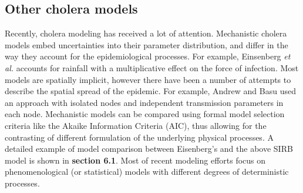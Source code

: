 \subsection{Other cholera models}

Recently, cholera modeling has received a lot of attention. Mechanistic cholera models embed uncertainties into their parameter distribution, and differ in the way they account for the epidemiological processes\cite{Kirpich:ControllingCholeraOuest:2017,Tuite:CholeraEpidemicHaiti:2011,Chao:VaccinationStrategiesEpidemic:2011,Kirpich:CholeraTransmissionOuest:2015}. For example, Einsenberg \textit{et al.} accounts for rainfall with a multiplicative effect on the force of infection\cite{Eisenberg:ExaminingRainfallCholera:2013,Eisenberg:IdentifiabilityEstimationMultiple:2013,Eisenberg:CholeraModelPatchy:2013}. Most models are spatially implicit, however there have been a number of attempts to describe the spatial spread of the epidemic. For example, Andrew and Basu used an approach with isolated nodes and independent transmission parameters in each node\cite{Andrews:TransmissionDynamicsControl:2011}.  Mechanistic models can be compared using formal model selection criteria like the Akaike Information Criteria (AIC)\cite{Akaike:NewLookStatistical:1974}, thus allowing for the contrasting of different formulation of the underlying physical processes\cite{Baracchini:SeasonalityCholeraDynamics:2017,King:InapparentInfectionsCholera:2008,Akman:ExaminationModelsCholera:2016, Rinaldo:Reassessment20102011:2012}. A detailed example of model comparison between Eisenberg's and the above SIRB model is shown in \textbf{section 6.1}. Most of recent modeling efforts focus on phenomenological (or statistical) models with different degrees of deterministic processes\cite{Azman:UrbanCholeraTransmission:2012,Finger:PotentialImpactCasearea:2018,Camacho:CholeraEpidemicYemen:2018,Lessler:MappingBurdenCholera:2018,Koelle:DisentanglingExtrinsicIntrinsic:2004}.



